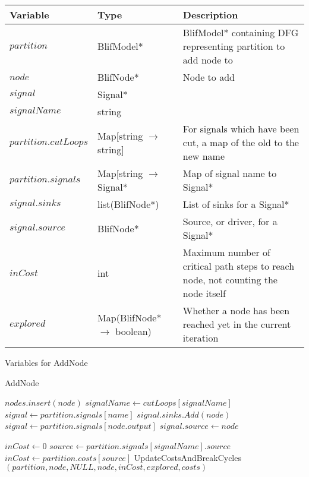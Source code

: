 \documentclass[12pt,final,oneside]{article} %
\begin{document}
\newpage
\begin{algorithm}
    \begin{center}
        \begin{tabularx}{\linewidth}{llX}
        \toprule
        Variable & Type & Description\\
        \midrule
        $partition$ & BlifModel* & BlifModel* containing DFG representing partition to add node to\\
        $node$ & BlifNode* & Node to add\\
        $signal$ & Signal* & \\
        $signalName$ & string & \\
        $partition.cutLoops$ & Map[string $\to$ string] & For signals which have been cut, a map of the old to the new name\\
        $partition.signals$ & Map[string $\to$ Signal* & Map of signal name to Signal* \\
        $signal.sinks$ & list(BlifNode*) & List of sinks for a Signal* \\
        $signal.source$ & BlifNode* & Source, or driver, for a Signal* \\
        $inCost$ & int & Maximum number of critical path steps to reach node, not counting the node itself \\
        $explored$ & Map(BlifNode* $\to$ boolean) & Whether a node has been reached yet in the current iteration \\ 
        \bottomrule
        \end{tabularx}
        \caption{Variables for AddNode}
        \label{varAddnode}
    \end{center}
   \caption{AddNode}\label{addnode}
   \begin{algorithmic}[1]
            \State $nodes.insert(node)$
                  \State $signalName \gets cutLoops[signalName]$ 
               \EndIf
               \State $signal \gets partition.signals[name]$
               \State $signal.sinks.Add(node)$
            \EndFor
            \State $signal \gets partition.signals[node.output]$
            \State $signal.source \gets node$

            \State $inCost \gets 0$
               \State $source \gets partition.signals[signalName].source$
                  \State $inCost \gets partition.costs[source]$
               \EndIf
            \EndFor
            \State UpdateCostsAndBreakCycles$(partition, node, NULL, node, inCost, explored, costs)$
         \EndProcedure
   \end{algorithmic}
\end{algorithm}
\end{document}
